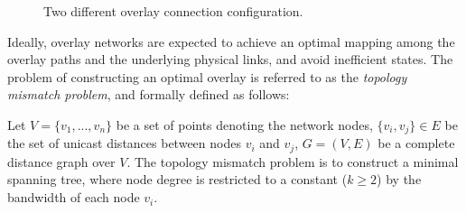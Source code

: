 \begin{figure}[ht]
\centering
{}\qquad\qquad
{}
\caption{Two different overlay connection configuration.}
\label{figure:overlay-confs}
\end{figure}

Ideally, overlay networks are expected to achieve an optimal mapping among the
overlay paths and the underlying physical links, and avoid inefficient states.
The problem of constructing an optimal overlay is referred to as the
\emph{topology mismatch problem}, and formally defined as follows:
\begin{definition}
Let $V = \{v_1, ..., v_n\}$ be a set of points denoting the network nodes,
$\{v_i, v_j\} \in E$ be the set of unicast distances between nodes $v_i$ and
$v_j$, $G=(V,E)$ be a complete distance graph over $V$. The topology mismatch
problem is to construct a minimal spanning tree,  where node degree is
restricted to a constant ($k\geq 2$) by the bandwidth of each node $v_i$.
\end{definition}

